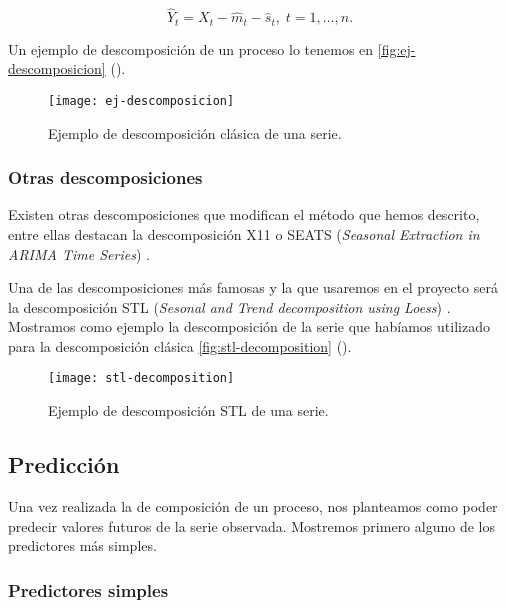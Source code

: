 \begin{equation}
  \hat{Y}_t = X_t - \hat{m}_t - \hat{s}_t, \; t = 1, \ldots, n.
  \label{eq:decomp-6}
\end{equation}

Un ejemplo de descomposición de un proceso lo tenemos en \autoref{fig:ej-descomposicion} (\cite{hyndman2018forecasting}).

\begin{figure}[htpb]
  \centering
  \texttt{[image: ej-descomposicion]}
  \caption{Ejemplo de descomposición clásica de una serie.}
  \label{fig:ej-descomposicion}
\end{figure}

\subsubsection{Otras descomposiciones}

Existen otras descomposiciones que modifican el método que hemos descrito, entre ellas destacan la descomposición X11 \cite{shiskin1965x, dagum2016seasonal} o SEATS (\emph{Seasonal Extraction in ARIMA Time Series}) \cite{gomez1995programs, dagum2016seasonal}.

Una de las descomposiciones más famosas y la que usaremos en el proyecto será la descomposición STL (\emph{Sesonal and Trend decomposition using Loess}) \cite{cleveland1990stl}. Mostramos como ejemplo la descomposición de la serie que habíamos utilizado para la descomposición clásica \autoref{fig:stl-decomposition} (\cite{hyndman2018forecasting}).

\begin{figure}[htpb]
  \centering
  \texttt{[image: stl-decomposition]}
  \caption{Ejemplo de descomposición STL de una serie.}
  \label{fig:stl-decomposition}
\end{figure}

\subsection{Predicción}

Una vez realizada la de composición de un proceso, nos planteamos como poder predecir valores futuros de la serie observada. Mostremos primero alguno de los predictores más simples.

\subsubsection{Predictores simples}

